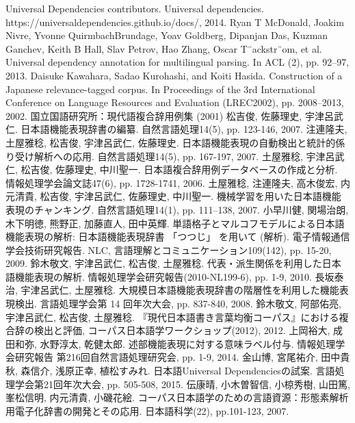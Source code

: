 \documentclass[twocolumn]{jarticle}
\begin{document}

\begin{thebibliography}{99}
\footnotesize{
	Universal Dependencies contributors. Universal dependencies. https://universaldependencies.github.io/docs/, 2014.
	Ryan T McDonald, Joakim Nivre, Yvonne QuirmbachBrundage, Yoav Goldberg, Dipanjan Das, Kuzman Ganchev, Keith B Hall, Slav Petrov, Hao Zhang, Oscar T¨ackstr¨om, et al. Universal dependency annotation for multilingual parsing. In ACL (2), pp. 92–97, 2013.
	Daisuke Kawahara, Sadao Kurohashi, and Koiti Hasida.
	Construction of a Japanese relevance-tagged corpus. In Proceedings of the 3rd International Conference on Language Resources and Evaluation (LREC2002), pp. 2008–2013, 2002.
	国立国語研究所：現代語複合辞用例集 (2001)
	松吉俊, 佐藤理史, 宇津呂武仁. 日本語機能表現辞書の編纂. 自然言語処理14(5), pp. 123-146, 2007.
	注連隆夫, 土屋雅稔, 松吉俊, 宇津呂武仁, 佐藤理史. 日本語機能表現の自動検出と統計的係り受け解析への応用. 自然言語処理14(5), pp. 167-197, 2007.
	土屋雅稔, 宇津呂武仁, 松吉俊, 佐藤理史, 中川聖一. 日本語複合辞用例データベースの作成と分析. 情報処理学会論文誌47(6), pp. 1728-1741, 2006.
	土屋雅稔, 注連隆夫, 高木俊宏, 内元清貴, 松吉俊, 宇津呂武仁, 佐藤理史, 中川聖一. 機械学習を用いた日本語機能表現のチャンキング. 自然言語処理14(1), pp. 111–138, 2007.
	小早川健, 関場治朗, 木下明徳, 熊野正, 加藤直人, 田中英輝. 単語格子とマルコフモデルによる日本語機能表現の解析: 日本語機能表現辞書 「つつじ」 を用いて (解析). 電子情報通信学会技術研究報告. NLC, 言語理解とコミュニケーション109(142), pp. 15-20, 2009.
	鈴木敬文, 宇津呂武仁, 松吉俊, 土屋雅稔. 代表・派生関係を利用した日本語機能表現の解析. 情報処理学会研究報告(2010-NL199-6), pp. 1-9, 2010.
	長坂泰治, 宇津呂武仁, 土屋雅稔. 大規模日本語機能表現辞書の階層性を利用した機能表現検出. 言語処理学会第 14 回年次大会, pp. 837-840, 2008.
	鈴木敬文, 阿部佑亮, 宇津呂武仁, 松吉俊, 土屋雅稔. 『現代日本語書き言葉均衡コーパス』における複合辞の検出と評価, コーパス日本語学ワークショップ(2012), 2012.
	上岡裕大, 成田和弥, 水野淳太, 乾健太郎. 述部機能表現に対する意味ラベル付与. 情報処理学会研究報告 第216回自然言語処理研究会, pp. 1-9, 2014.
	金山博, 宮尾祐介, 田中貴秋, 森信介, 浅原正幸, 植松すみれ. 日本語Universal Dependenciesの試案. 言語処理学会第21回年次大会, pp. 505-508, 2015.
	伝康晴, 小木曽智信, 小椋秀樹, 山田篤, 峯松信明, 内元清貴, 小磯花絵. コーパス日本語学のための言語資源：形態素解析用電子化辞書の開発とその応用. 日本語科学(22), pp.101-123, 2007.
}
\end{thebibliography}
\end{document}

